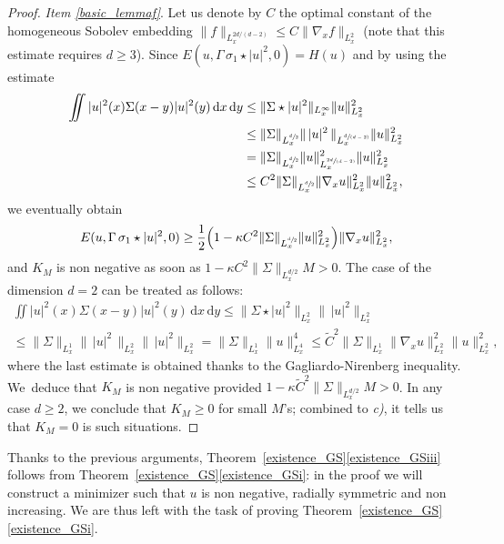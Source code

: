 \documentclass[11pt]{article}
\newcommand{\spfrac}[2]{\sfrac{#1}{(#2)}}
\let\tilde\oldtilde
\theoremstyle{definition}
\let\tilde\widetilde
\let\ds\displaystyle
\newcommand{\ud}{\, {\mathrm{d}}}
\begin{document}
\begin{proof}
\textit{Item \eqref{basic_lemmaf}}. Let us denote by $C$ the optimal constant of the homogeneous Sobolev embedding $\|f\|_{L_{x}^{2d/(d-2)}}\leq C\|\nabla_{x}f\|_{L_{x}^{2}}$ (note that this estimate requires $d\geq 3$). Since $E(u,\Gamma\,\sigma_{1}\star|u|^{2},0)=H(u)$ and by using the estimate\vspace*{-3pt}
\begin{align*}
\iint|u|^{2}(x)\Sigma(x-y)|u|^{2}(y)\ud x\ud y&\leq\|\Sigma\star|u|^{2}\|_{L_{x}^{\infty}}\|u\|_{L_{x}^{2}}^{2}\\
&\leq\|\Sigma\|_{L_{x}^{\sfrac{d}{2}}}\|\,|u|^{2}\,\|_{L_{x}^{\spfrac{d}{d-2}}}\|u\|_{L_{x}^{2}}^{2}\\
&=\|\Sigma\|_{L_{x}^{\sfrac{d}{2}}}\|u\|_{L_{x}^{\spfrac{2d}{d-2}}}^{2}\|u\|_{L_{x}^{2}}^{2}\\
&\leq C^{2}\|\Sigma\|_{L_{x}^{\sfrac{d}{2}}}\|\nabla_{x}u\|_{L_{x}^{2}}^{2}\|u\|_{L_{x}^{2}}^{2},
\end{align*}
we eventually obtain\vspace*{-3pt}
\[
E(u,\Gamma\,\sigma_{1}\star|u|^{2},0)\geq\frac{1}{2}\Bigl(1-\kappa C^{2}\|\Sigma\|_{L_{x}^{\sfrac{d}{2}}}\|u\|_{L_{x}^{2}}^{2}\Bigr)\|\nabla_{x}u\|_{L_{x}^{2}}^{2},
\]
and $K_{M}$ is non negative as soon as $1-\kappa C^{2}\|\Sigma\|_{L_{x}^{d/2}}M>0$. The case of the dimension $d=2$ can be treated as follows:\vspace*{-5pt}
\begin{multline*}
\ds\iint|u|^{2}(x)\Sigma(x-y)|u|^{2}(y)\ud x\ud y\leq\|\Sigma\star|u|^{2}\|_{L_{x}^{2}}\|\,|u|^{2}\|_{L_{x}^{2}}\\
\ds\leq\|\Sigma\|_{L_{x}^{1}}\|\,|u|^{2}\,\|_{L_{x}^{2}}\|\,|u|^{2}\|_{L_{x}^{2}}=\|\Sigma\|_{L_{x}^{1}}\|u\|_{L_{x}^{4}}^{4}\leq \widetilde{C}^{2}\|\Sigma\|_{L_{x}^{1}}\|\nabla_{x}u\|_{L_{x}^{2}}^{2}\|u\|_{L_{x}^{2}}^{2},
\end{multline*}
where the last estimate is obtained thanks to the Gagliardo-Nirenberg inequality.
We~deduce that $K_{M}$ is non negative provided $1-\kappa \tilde C^{2}\|\Sigma\|_{L_{x}^{d/2}}M>0$.
In any case $d\geq 2$, we conclude that $K_M\geq 0$ for small $M$'s; combined to \textit{c)}, it tells us that $K_M=0$ is such situations.
\end{proof}

Thanks to the previous arguments, Theorem~\ref{existence_GS}\eqref{existence_GSiii} follows from Theorem~\ref{existence_GS}\eqref{existence_GSi}: in the proof we will construct a minimizer such that $u$ is non negative, radially symmetric and non increasing. We are thus left with the task of proving Theorem~\ref{existence_GS}\eqref{existence_GSi}.
\end{document}

